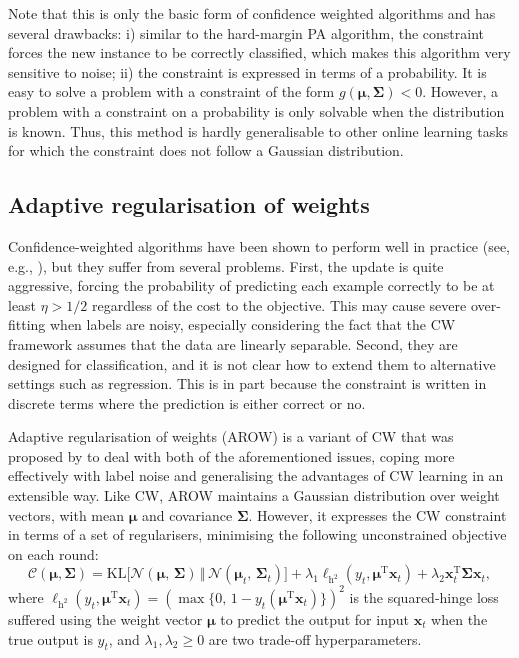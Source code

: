 Note that this is only the basic form of confidence weighted algorithms and has several drawbacks: i) similar to the hard-margin PA algorithm, the constraint forces the new instance to be correctly classified, which makes this algorithm very sensitive to noise; ii) the constraint is expressed in terms of a probability. It is easy to solve a problem with a constraint of the form $g(\boldsymbol{\mu}, \boldsymbol{\Sigma}) < 0$. However, a problem with a constraint on a probability is only solvable when the distribution is known. Thus, this method is hardly generalisable to other online learning tasks for which the constraint does not follow a Gaussian distribution.

\subsection{Adaptive regularisation of weights}

Confidence-weighted algorithms have been shown to perform well in practice (see, e.g., \citep{dredze08}), but they suffer from several problems. First, the update is quite aggressive, forcing the probability of predicting each example correctly to be at least $\eta > 1/2$ regardless of the cost to the objective. This may cause severe over-fitting when labels are noisy, especially considering the fact that the CW framework assumes that the data are linearly separable. Second, they are designed for classification, and it is not clear how to extend them to alternative settings such as regression. This is in part because the constraint is written in discrete terms where the prediction is either correct or no.

Adaptive regularisation of weights (AROW) is a variant of CW that was proposed by \citet{arow} to deal with both of the aforementioned issues, coping more effectively with label noise and generalising the advantages of CW learning in an extensible way. Like CW, AROW maintains a Gaussian distribution over weight vectors, with mean $\boldsymbol{\mu}$ and covariance $\boldsymbol{\Sigma}$. However, it expresses the CW constraint in terms of a set of regularisers, minimising the following unconstrained objective on each round:
\begin{equation}
	\mathcal{C}(\boldsymbol{\mu}, \boldsymbol{\Sigma})
	= \mathrm{KL}\big[\mathcal{N}(\boldsymbol{\mu},\, \boldsymbol{\Sigma}) \, \Vert \, \mathcal{N}(\boldsymbol{\mu}_t,\, \boldsymbol{\Sigma}_t)\big]
	+ \lambda_1 \ell_{\mathrm{h}^2}(y_t, \boldsymbol{\mu}^\text{T}\mathbf{x}_t) + \lambda_2 \mathbf{x}_t^\text{T}\boldsymbol{\Sigma}\mathbf{x}_t,
\end{equation}
where $\ell_{\mathrm{h}^2}(y_t, \boldsymbol{\mu}^\text{T}\mathbf{x}_t) = (\max\{0, \, 1 - y_t(\boldsymbol{\mu}^\text{T}\mathbf{x}_t)\})^2$ is the squared-hinge loss suffered using the weight vector $\boldsymbol{\mu}$ to predict the output for input $\mathbf{x}_t$ when the true output is $y_t$, and $\lambda_1, \lambda_2 \geq 0$ are two trade-off hyperparameters.

